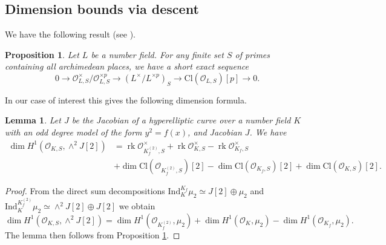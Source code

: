 \documentclass[11pt]{amsart}
\def\F{\mathbb F}
\theoremstyle{plain}
\newtheorem{lemma}{Lemma}
\newtheorem{proposition}{Proposition}
\theoremstyle{definition}
\newcommand{\Cl}{\mathrm{Cl}}
\newcommand{\Ind}{\mathrm{Ind}}
\DeclareMathOperator{\rk}{rk}
\begin{document}
\subsection{Dimension bounds via descent}
We have the following result (see \cite[Proposition 12.6]{PS97}).
\begin{proposition}\label{prop:PS}
Let $L$ be a number field. For any finite set $S$ of primes containing all archimedean places, we have a short exact sequence
\[
0\to \mathcal{O}_{L,S}^\times /\mathcal{O}_{L,S}^{\times p} \to (L^\times /L^{\times p})_S \to \Cl (\mathcal{O}_{L,S})[p]\to 0.
\]
\end{proposition}
In our case of interest this gives the following dimension formula.
\begin{lemma}\label{lemma:PS2}
Let $J$ be the Jacobian of a hyperelliptic curve over a number field $K$ with an odd degree model of the form $y^2 =f(x)$, and Jacobian $J$. 
We have
\begin{align*}
\dim H^1 (\mathcal{O}_{K,S},\wedge ^2 J[2]) & =\rk \mathcal{O}_{K_f ^{(2)},S}^\times +\rk \mathcal{O}_{K,S}^\times -\rk \mathcal{O}_{K_f ,S}^\times \\
& + \dim \Cl (\mathcal{O}_{K_f ^{(2)},S})[2]-\dim \Cl (\mathcal{O}_{K_f ,S})[2]+\dim \Cl (\mathcal{O}_{K,S})[2].
\end{align*}
\end{lemma}
\begin{proof}
From the direct sum decompositions $\Ind ^{K_f }_K \mu _2 \simeq J[2]\oplus \mu _2 $ and $\Ind ^{K_f ^{(2)}}_K \mu _2 \simeq \wedge ^2 J[2]\oplus J[2]$ we obtain 
\[
\dim H^1 (\mathcal{O}_{K,S},\wedge ^2 J[2])=\dim H^1 (\mathcal{O}_{K_f ^{(2)}},\mu _2 )+\dim H^1 (\mathcal{O}_{K},\mu _2 )-\dim H^1 (\mathcal{O}_{K_f },\mu _2 ).
\]
The lemma then follows from Proposition \ref{prop:PS}.
%
\end{proof}
\end{document}
